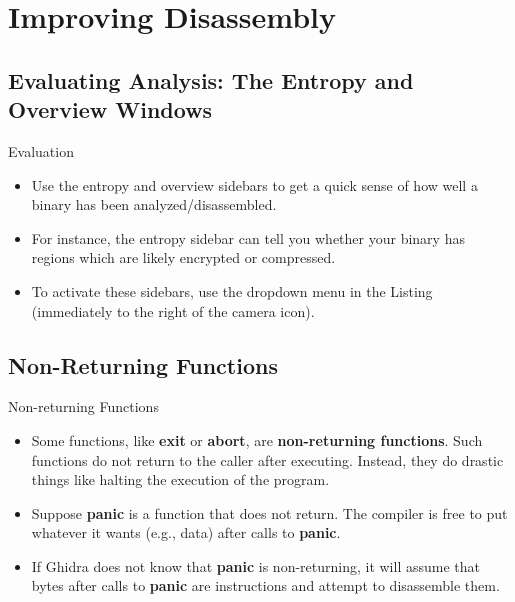 \documentclass{beamer}
\begin{document}
\section{Improving Disassembly}

\subsection{Evaluating Analysis: The Entropy and Overview Windows}

\begin{frame}
\begin{block}{Evaluation} 
\begin{itemize}
\item Use the entropy and overview sidebars to get a quick sense of how well a binary has been analyzed/disassembled. 
\item For instance, the entropy sidebar can tell you whether your binary has regions which are likely encrypted or compressed.
\item To activate these sidebars, use the dropdown menu in the Listing (immediately to the right of the camera icon).
\end{itemize}
\end{block}
\end{frame}

\subsection{Non-Returning Functions}
\begin{frame}
\begin{block}{Non-returning Functions}
\begin{itemize}
\item Some functions, like \textbf{exit} or \textbf{abort}, are \textbf{non-returning functions}.  Such functions do not return to the caller after executing. Instead, they
do drastic things like halting the execution of the program. 
\item Suppose \textbf{panic} is a function that does not return. The compiler is free to put whatever it wants (e.g., data) after calls to \textbf{panic}.
\item If Ghidra does not know that \textbf{panic} is non-returning, it will assume that bytes after calls to \textbf{panic} are instructions and attempt to disassemble them.
\end{itemize}
\end{block}
\end{frame}
\end{document}
